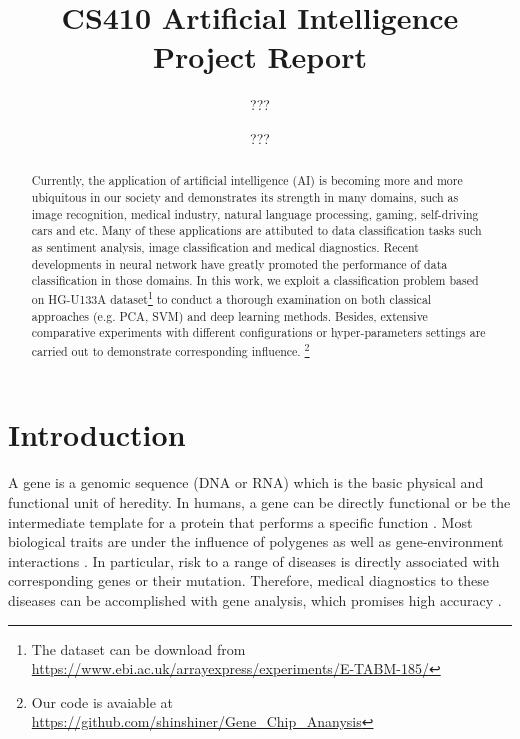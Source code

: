 \documentclass[10pt,twocolumn,letterpaper]{article}
\begin{document}
\title{
  CS410 Artificial Intelligence\\
  Project Report
}

\author{
  ???\\
  \and
  ???\\
}

\maketitle

\begin{abstract}
Currently, the application of artificial intelligence (AI) is becoming more and more ubiquitous in our society and demonstrates its strength in many domains, such as image recognition, medical industry, natural language processing, gaming, self-driving cars and etc. Many of these applications are attibuted to data classification tasks such as sentiment analysis, image classification and medical diagnostics. Recent developments in neural network have greatly promoted the performance of data classification in those domains. In this work, we exploit a classification problem based on HG-U133A dataset\footnote{The dataset can be download from \url{https://www.ebi.ac.uk/arrayexpress/experiments/E-TABM-185/}} to conduct a thorough examination on both classical approaches (e.g. PCA, SVM) and deep learning methods. Besides, extensive comparative experiments with different configurations or hyper-parameters settings are carried out to demonstrate corresponding influence.
\footnote{Our code is avaiable at \url{https://github.com/shinshiner/Gene_Chip_Ananysis}}

\end{abstract}

\section{Introduction}

\label{sec:intro}
	A gene is a genomic sequence (DNA or RNA) which is the basic physical and functional unit of heredity. In humans, a gene can be directly functional or be the intermediate template for a protein that performs a specific function \cite{gene}. Most biological traits are under the influence of polygenes as well as gene-environment interactions \cite{whatisGene}. In particular, risk to a range of diseases is directly associated with corresponding genes or their mutation. Therefore, medical diagnostics to these diseases can be accomplished with gene analysis, which promises high accuracy \cite{globalViewOfGene, genegene}.
	
\end{document}

